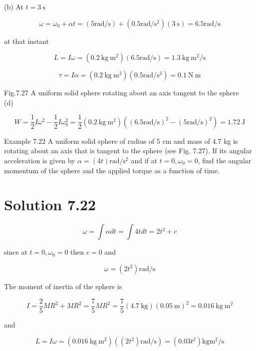 \documentclass[10pt]{article}
\begin{document}
(b) At $t=3 \mathrm{~s}$

$$
\omega=\omega_{0}+\alpha t=(5 \mathrm{rad} / \mathrm{s})+\left(0.5 \mathrm{rad} / \mathrm{s}^{2}\right)(3 \mathrm{~s})=6.5 \mathrm{rad} / \mathrm{s}
$$

at that instant

$$
L=I \omega=\left(0.2 \mathrm{~kg} \mathrm{~m}^{2}\right)(6.5 \mathrm{rad} / \mathrm{s})=1.3 \mathrm{~kg} \mathrm{~m}^{2} / \mathrm{s}
$$


\begin{equation*}
\tau=I \alpha=\left(0.2 \mathrm{~kg} \mathrm{~m}^{2}\right)\left(0.5 \mathrm{rad} / \mathrm{s}^{2}\right)=0.1 \mathrm{~N} \mathrm{~m} \tag{c}
\end{equation*}


Fig.7.27 A uniform solid sphere rotating about an axis tangent to the sphere\\
(d)

$$
W=\frac{1}{2} I \omega^{2}-\frac{1}{2} I \omega_{0}^{2}=\frac{1}{2}\left(0.2 \mathrm{~kg} \mathrm{~m}^{2}\right)\left((6.5 \mathrm{rad} / \mathrm{s})^{2}-(5 \mathrm{rad} / \mathrm{s})^{2}\right)=1.72 \mathrm{~J}
$$

Example 7.22 A uniform solid sphere of radius of 5 cm and mass of 4.7 kg is rotating about an axis that is tangent to the sphere (see Fig. 7.27). If its angular acceleration is given by $\alpha=(4 t) \mathrm{rad} / \mathrm{s}^{2}$ and if at $t=0, \omega_{0}=0$, find the angular momentum of the sphere and the applied torque as a function of time.

\section*{Solution 7.22}
$$
\omega=\int \alpha d t=\int 4 t d t=2 t^{2}+c
$$

since at $t=0, \omega_{0}=0$ then $c=0$ and

$$
\omega=\left(2 t^{2}\right) \mathrm{rad} / \mathrm{s}
$$

The moment of inertia of the sphere is

$$
I=\frac{2}{5} M R^{2}+M R^{2}=\frac{7}{5} M R^{2}=\frac{7}{5}(4.7 \mathrm{~kg})(0.05 \mathrm{~m})^{2}=0.016 \mathrm{~kg} \mathrm{~m}^{2}
$$

and

$$
L=I \omega=\left(0.016 \mathrm{~kg} \mathrm{~m}^{2}\right)\left(\left(2 t^{2}\right) \mathrm{rad} / \mathrm{s}\right)=\left(0.03 t^{2}\right) \mathrm{kg} \mathrm{m}^{2} / \mathrm{s}
$$
\end{document}
